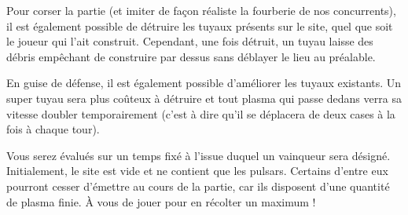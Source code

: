 Pour corser la partie (et imiter de façon réaliste la fourberie de nos
concurrents), il est également possible de détruire les tuyaux présents sur le
site, quel que soit le joueur qui l'ait construit. Cependant, une fois détruit,
un tuyau laisse des débris empêchant de construire par dessus sans déblayer le
lieu au préalable.

En guise de défense, il est également possible d'améliorer les tuyaux
existants. Un super tuyau sera plus coûteux à détruire et tout plasma qui passe
dedans verra sa vitesse doubler temporairement (c'est à dire qu'il se déplacera
de deux cases à la fois à chaque tour).

Vous serez évalués sur un temps fixé à l'issue duquel un vainqueur sera
désigné. Initialement, le site est vide et ne contient que les pulsars.
Certains d'entre eux pourront cesser d'émettre au cours de la partie, car ils
disposent d'une quantité de plasma finie. À vous de jouer pour en récolter un
maximum !
